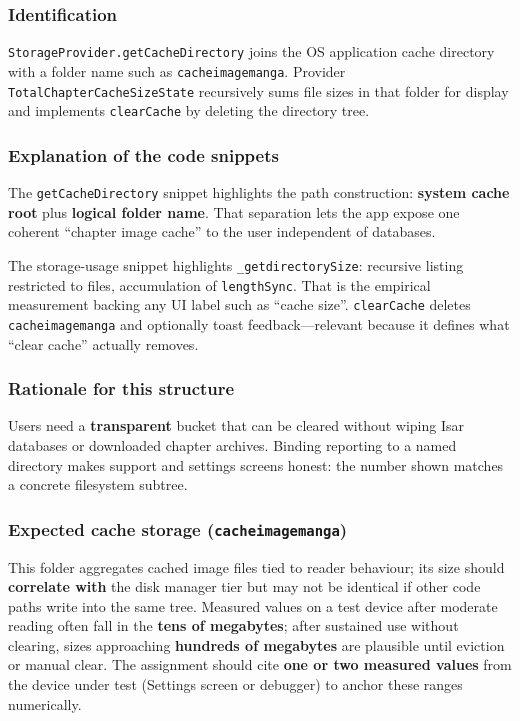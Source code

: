 \subsubsection*{Identification}
\texttt{StorageProvider.getCacheDirectory} joins the OS application cache directory with a folder name such as \texttt{cacheimagemanga}. Provider \texttt{TotalChapterCacheSizeState} recursively sums file sizes in that folder for display and implements \texttt{clearCache} by deleting the directory tree.

\subsubsection*{Explanation of the code snippets}
The \texttt{getCacheDirectory} snippet highlights the path construction: \textbf{system cache root} plus \textbf{logical folder name}. That separation lets the app expose one coherent ``chapter image cache'' to the user independent of databases.

The storage-usage snippet highlights \texttt{\_getdirectorySize}: recursive listing restricted to files, accumulation of \texttt{lengthSync}. That is the empirical measurement backing any UI label such as ``cache size''. \texttt{clearCache} deletes \texttt{cacheimagemanga} and optionally toast feedback---relevant because it defines what ``clear cache'' actually removes.

\subsubsection*{Rationale for this structure}
Users need a \textbf{transparent} bucket that can be cleared without wiping Isar databases or downloaded chapter archives. Binding reporting to a named directory makes support and settings screens honest: the number shown matches a concrete filesystem subtree.

\subsubsection*{Expected cache storage (\texttt{cacheimagemanga})}
This folder aggregates cached image files tied to reader behaviour; its size should \textbf{correlate with} the disk manager tier but may not be identical if other code paths write into the same tree. Measured values on a test device after moderate reading often fall in the \textbf{tens of megabytes}; after sustained use without clearing, sizes approaching \textbf{hundreds of megabytes} are plausible until eviction or manual clear. The assignment should cite \textbf{one or two measured values} from the device under test (Settings screen or debugger) to anchor these ranges numerically.

